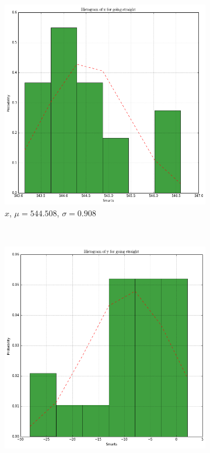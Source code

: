 \documentclass[paper=a4, fontsize=11pt]{scrartcl} %
\begin{document}
    \begin{figure}[h!]
        \centering
        \begin{subfigure}[b]{0.3\textwidth}
            \setlength{\fboxsep}{0.5pt} %
            \setlength{\fboxrule}{0.5pt}
            \includegraphics[width=\textwidth,fbox]{images/histogram_1_x_straight.png}
            \caption{$x$, $\mu = 544.508$, $\sigma = 0.908$}
        \end{subfigure}
        ~
        \begin{subfigure}[b]{0.3\textwidth}
            \setlength{\fboxsep}{0.5pt} %
            \setlength{\fboxrule}{0.5pt}
            \includegraphics[width=\textwidth,fbox]{images/histogram_1_y_straight.png}

\end{subfigure}
\end{figure}
\end{document}
